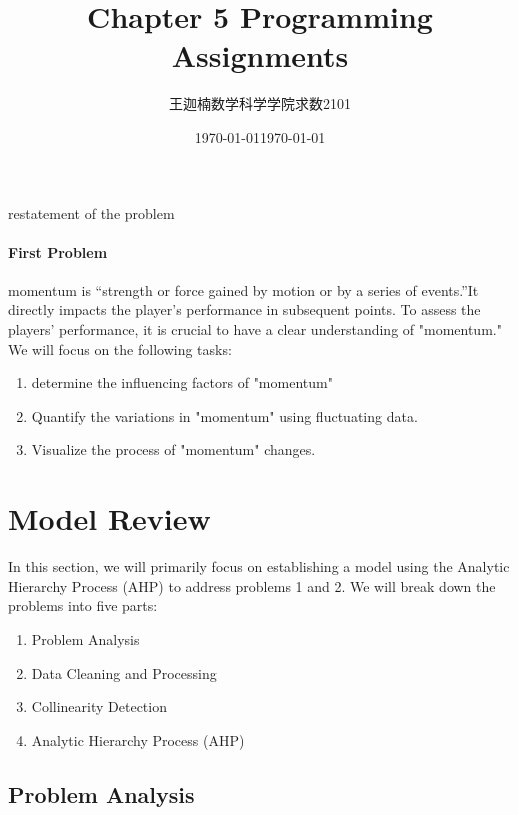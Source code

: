 \documentclass[12pt, a4paper, oneside]{article}
\date{\today}
\title{Chapter 5 Programming Assignments}
\author{王迦楠\quad 数学科学学院\quad 求数2101\quad 3210105175}
\date{\today}
\theoremstyle{break}
\begin{document}
\maketitle

restatement of the problem

\paragraph{First Problem}
momentum is “strength or force gained by motion or by a series of 
events.”It directly impacts the player's performance in subsequent points.
To assess the players' performance, it is crucial to have a clear understanding of "momentum." 
We will focus on the following tasks: 
 \begin{enumerate}
    \item determine the influencing factors of "momentum" 
    \item Quantify the variations in "momentum" using fluctuating data.
    \item Visualize the process of "momentum" changes.
\end{enumerate}
 



\section{Model Review}

In this section, we will primarily focus on establishing a model using the Analytic Hierarchy Process (AHP) to address problems 1 and 2. We will break down the problems into five parts:
\begin{enumerate}
\item Problem Analysis
\item Data Cleaning and Processing
\item Collinearity Detection
\item Analytic Hierarchy Process (AHP)
\end{enumerate}

\subsection{Problem Analysis}
\end{document}
